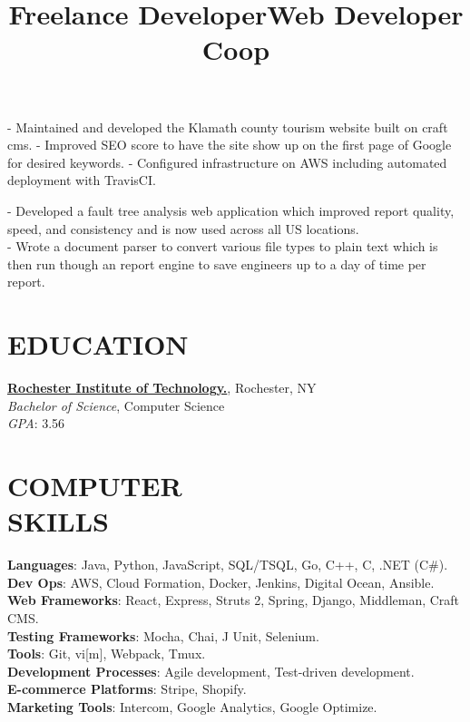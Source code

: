 \documentclass[margin]{res}
\begin{document}
\begin{resume}
\title{\textbf{Freelance Developer}}
\begin{position}
- Maintained and developed the Klamath county tourism website built on craft cms.
- Improved SEO score to have the site show up on the first page of Google for desired keywords.
- Configured infrastructure on AWS including automated deployment with TravisCI.
\end{position}

\title{\textbf{Web Developer Coop}}
\begin{position}
- Developed a fault tree analysis web application which improved report quality, speed, and consistency and is now used across all US locations.\\
- Wrote a document parser to convert various file types to plain text which is then run though an report engine to save engineers up to a day of time per report.
\end{position}

\section{EDUCATION}
\textbf{\href{https://rit.edu}{Rochester Institute of Technology.}}, Rochester, NY\\
{\sl Bachelor of Science}, Computer Science\\
{\sl GPA}: 3.56


\section{COMPUTER\\SKILLS}

\textbf{Languages}: Java, Python, JavaScript, SQL/TSQL, Go, C++, C, .NET (C\#).\\
\textbf{Dev Ops}: AWS, Cloud Formation, Docker, Jenkins, Digital Ocean, Ansible.\\
\textbf{Web Frameworks}: React, Express, Struts 2, Spring, Django, Middleman, Craft CMS.\\
\textbf{Testing Frameworks}: Mocha, Chai, J Unit, Selenium.\\
\textbf{Tools}: Git, vi[m], Webpack, Tmux.\\
\textbf{Development Processes}: Agile development, Test-driven development.\\
\textbf{E-commerce Platforms}: Stripe, Shopify.\\
\textbf{Marketing Tools}: Intercom, Google Analytics, Google Optimize.



\end{resume}
\end{document}
